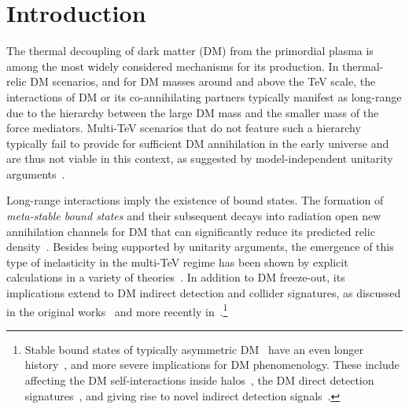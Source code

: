\documentclass[preprint,5p,twocolumn]{elsarticle}
\begin{document}


\section{Introduction \label{Sec:Intro}}

The thermal decoupling of dark matter (DM) from the primordial plasma is among the most widely considered mechanisms for its production. In thermal-relic DM scenarios, and for DM masses around and above the TeV scale, the interactions of DM or its co-annihilating partners typically manifest as long-range due to the hierarchy between the large DM mass and the smaller mass of the force mediators. Multi-TeV scenarios that do not feature such a hierarchy typically fail to provide for sufficient DM annihilation in the early universe and are thus not viable in this context, as suggested by model-independent unitarity arguments~\cite{Hisano:2002fk,Baldes:2017gzw}.  


Long-range interactions imply the existence of bound states. The formation of \emph{meta-stable bound states} and their subsequent decays into radiation open new annihilation channels for DM that can significantly reduce its predicted relic density~\cite{vonHarling:2014kha}.  Besides being supported by unitarity arguments, the emergence of this type of inelasticity in the multi-TeV regime has been shown by explicit calculations in a variety of theories~\cite{
vonHarling:2014kha,
Ellis:2015vaa,
Baldes:2017gzw,
Harz:2018csl,
Harz:2019rro,
Harz:2017dlj,
Kim:2016zyy,
Biondini:2017ufr,
Biondini:2018pwp,
Biondini:2018ovz,
Biondini:2019int,
Binder:2018znk,
Ko:2019wxq,
Oncala:2019yvj,
Binder:2019erp,
Binder:2020efn,
Binder:2021otw,
Oncala:2021tkz,
Oncala:2021swy,
Bottaro:2021snn}. 
In addition to DM freeze-out, its implications extend to  DM indirect detection and collider signatures, as discussed in the original works~\cite{Pospelov:2008jd,MarchRussell:2008tu,Shepherd:2009sa}
and more recently in~\cite{An:2016gad,An:2016kie,Kouvaris:2016ltf,Asadi:2016ybp,Cirelli:2016rnw,Baldes:2017gzu,Cirelli:2018iax}.\footnote{
Stable bound states of typically asymmetric DM~\cite{Petraki:2013wwa} have an even longer history~\cite{Nussinov:1985xr,Kusenko:1997si,Foot:2004pa}, and more severe implications for DM phenomenology. These include affecting 
the DM self-interactions inside halos~\cite{Kusenko:2001vu,CyrRacine:2012fz,Petraki:2014uza,Wise:2014jva}, 
the DM direct detection signatures~\cite{Laha:2013gva,Cline:2012is,Kahlhoefer:2020rmg}, 
and giving rise to novel indirect detection signals~\cite{Pearce:2013ola,Pearce:2015zca,Cline:2014eaa,Detmold:2014qqa,Mahbubani:2019pij,Baldes:2020hwx}.}
\end{document}

